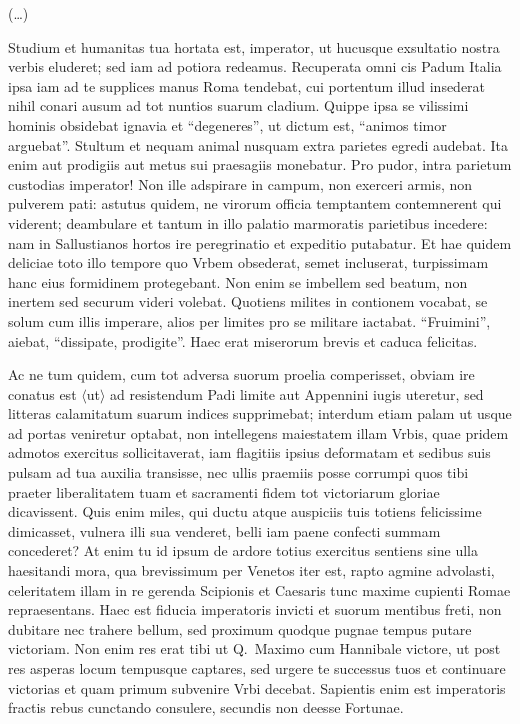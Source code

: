 (\dots)

Studium et humanitas tua hortata est, imperator, ut hucusque exsultatio nostra verbis eluderet; sed iam ad potiora redeamus. Recuperata omni cis Padum Italia ipsa iam ad te supplices manus Roma tendebat, cui portentum illud insederat nihil conari ausum ad tot nuntios suarum cladium. Quippe ipsa se vilissimi hominis obsidebat ignavia et ``degeneres'', ut dictum est, ``animos timor arguebat''. Stultum et nequam animal nusquam extra parietes egredi audebat. Ita enim aut prodigiis aut metus sui praesagiis monebatur.  Pro pudor, intra parietum custodias imperator! Non ille adspirare in campum, non exerceri armis, non pulverem pati: astutus quidem, ne virorum officia temptantem contemnerent qui viderent; deambulare et tantum in illo palatio marmoratis parietibus incedere: nam in Sallustianos hortos ire peregrinatio et expeditio putabatur. Et hae quidem deliciae toto illo tempore quo Vrbem obsederat, semet incluserat, turpissimam hanc eius formidinem protegebant. Non enim se imbellem sed beatum, non inertem sed securum videri volebat. Quotiens milites in contionem vocabat, se solum cum illis imperare, alios per limites pro se militare iactabat. ``Fruimini'', aiebat, ``dissipate, prodigite''. Haec erat miserorum brevis et caduca felicitas.

Ac ne tum quidem, cum tot adversa suorum proelia comperisset, obviam ire conatus est $\langle$ut$\rangle$ ad resistendum Padi limite aut Appennini iugis uteretur, sed litteras calamitatum suarum indices supprimebat; interdum etiam palam ut usque ad portas veniretur optabat, non intellegens maiestatem illam Vrbis, quae pridem admotos exercitus sollicitaverat, iam flagitiis ipsius deformatam et sedibus suis pulsam ad tua auxilia transisse, nec ullis praemiis posse corrumpi quos tibi praeter liberalitatem tuam et sacramenti fidem tot victoriarum gloriae dicavissent. Quis enim miles, qui ductu atque auspiciis tuis totiens felicissime dimicasset, vulnera illi sua venderet, belli iam paene confecti summam concederet? At enim tu id ipsum de ardore totius exercitus sentiens sine ulla haesitandi mora, qua brevissimum per Venetos iter est, rapto agmine advolasti, celeritatem illam in re gerenda Scipionis et Caesaris tunc maxime cupienti Romae repraesentans.  Haec est fiducia imperatoris invicti et suorum mentibus freti, non dubitare nec trahere bellum, sed proximum quodque pugnae tempus putare victoriam. Non enim res erat tibi ut Q.~Maximo cum Hannibale victore, ut post res asperas locum tempusque captares, sed urgere te successus tuos et continuare victorias et quam primum subvenire Vrbi decebat. Sapientis enim est imperatoris fractis rebus cunctando consulere, secundis non deesse Fortunae.

